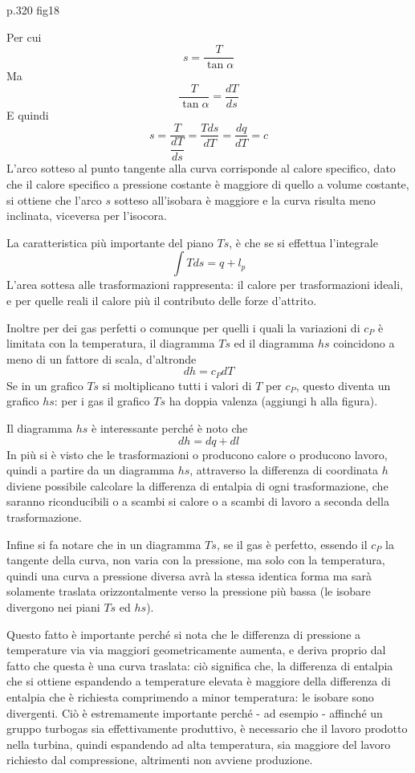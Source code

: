 \begin{adjustwidth}{2in}{}
	p.320 fig18		
	
	Per cui  
	\[s = \dfrac{T}{\tan\alpha} \] 
	Ma 
	\[\dfrac{T}{\tan\alpha} = \dfrac{dT}{ds} \]	
	E quindi 
	\[s = \dfrac{T}{\dfrac{dT}{ds}} = \dfrac{Tds}{dT} = \dfrac{dq}{dT} = c \] 
	L'arco sotteso al punto tangente alla curva  corrisponde al calore specifico, dato che il calore specifico a pressione costante è maggiore di quello a volume costante, si ottiene che l'arco $s$ sotteso all'isobara è maggiore e la curva risulta meno inclinata, viceversa per l'isocora.\newline
	
	La caratteristica più importante del piano $Ts$, è che se si effettua l'integrale 
	\[\int Tds =q + l_p\]
	L'area sottesa alle trasformazioni rappresenta: il calore per trasformazioni ideali, e per quelle reali il calore più il contributo delle forze d'attrito. \newline
	
	Inoltre per dei gas perfetti o comunque per quelli i quali la variazioni di $c_P$  è limitata con la temperatura, il diagramma $Ts$ ed il diagramma $hs$ coincidono a meno di un fattore di scala, d'altronde 
	\[dh = c_PdT\]
	Se in un grafico $Ts$ si moltiplicano tutti i valori di $T$ per $c_P$, questo diventa un grafico $hs$: per i gas il grafico $Ts$ ha doppia valenza (aggiungi h alla figura). \newline
	
	Il diagramma $hs$ è interessante  perché è noto che 
	\[dh = dq + dl\]
	In più si è visto che le trasformazioni o producono calore o producono lavoro, quindi a partire da un diagramma $hs$, attraverso la differenza di coordinata $h$  diviene  possibile calcolare la differenza di entalpia di ogni trasformazione, che saranno riconducibili o a scambi si calore o a scambi di lavoro a seconda della trasformazione. \newline
	
	
	Infine  si fa notare che in un diagramma $Ts$, se il gas è perfetto, essendo il $c_P$ la tangente della curva, non varia con la pressione, ma solo con la temperatura, quindi una curva a pressione diversa avrà la stessa identica forma ma sarà solamente traslata orizzontalmente verso la pressione più bassa (le isobare divergono nei piani $Ts$ ed $hs$).
	
	Questo fatto è importante perché si nota che le differenza di pressione a temperature via via maggiori geometricamente aumenta, e deriva proprio dal fatto che questa è una curva traslata: ciò significa che, la differenza di entalpia che si ottiene espandendo a temperature elevata  è maggiore della differenza di entalpia che è richiesta comprimendo a minor temperatura: le isobare sono divergenti.
	Ciò è estremamente importante perché - ad esempio - affinché un gruppo turbogas sia effettivamente produttivo, è necessario che  il lavoro prodotto nella turbina, quindi espandendo ad alta temperatura, sia maggiore del lavoro richiesto dal compressione, altrimenti non avviene produzione. 
	
	
\end{adjustwidth}
\newpage
